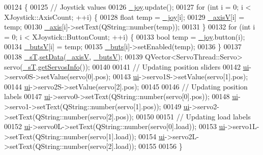 \begin{DoxyCode}
00124 \{
00125     \textcolor{comment}{// Joystick values}
00126     \hyperlink{a00005_a671f35800890e518713e1946671d8730}{\_joy}.update();
00127     \textcolor{keywordflow}{for} (\textcolor{keywordtype}{int} i = 0; i < XJoystick::AxisCount; ++i) \{
00128         \textcolor{keywordtype}{float} temp = \hyperlink{a00005_a671f35800890e518713e1946671d8730}{\_joy}[i];
00129         \hyperlink{a00005_a20f66f574ed4c96d8dfc0013e1095f15}{\_axisV}[i] = temp;
00130         \hyperlink{a00005_a30c99d7a544f74b0650758e5cc7ead5a}{\_axis}[i]->setText(QString::number(temp));
00131     \}
00132     \textcolor{keywordflow}{for} (\textcolor{keywordtype}{int} i = 0; i < XJoystick::ButtonCount; ++i) \{
00133         \textcolor{keywordtype}{bool} temp = \hyperlink{a00005_a671f35800890e518713e1946671d8730}{\_joy}.button(i);
00134         \hyperlink{a00005_a519ae4630572cb63fbd04bce12fe8e77}{\_butsV}[i] = temp;
00135         \hyperlink{a00005_a8eaf474e1b8672f32873ed009e28ce8a}{\_buts}[i]->setEnabled(temp);
00136     \}
00137     
00138     \hyperlink{a00005_a97f8ecc7ecb930b796178cef7b975013}{\_sT}.\hyperlink{a00008_a8497ea56991b620981ce1fbf53d9ebdb}{setData}(\hyperlink{a00005_a20f66f574ed4c96d8dfc0013e1095f15}{\_axisV}, \hyperlink{a00005_a519ae4630572cb63fbd04bce12fe8e77}{\_butsV});
00139     QVector<ServoThread::Servo> servo(\hyperlink{a00005_a97f8ecc7ecb930b796178cef7b975013}{\_sT}.\hyperlink{a00008_a5fd8ef13314428f5ba7646730cc58f1c}{getServosInfo}());
00140     
00141     \textcolor{comment}{// Updating position sliders}
00142     \hyperlink{a00005_a35466a70ed47252a0191168126a352a5}{ui}->servo0S->setValue(servo[0].pos);
00143     \hyperlink{a00005_a35466a70ed47252a0191168126a352a5}{ui}->servo1S->setValue(servo[1].pos);
00144     \hyperlink{a00005_a35466a70ed47252a0191168126a352a5}{ui}->servo2S->setValue(servo[2].pos);
00145     
00146     \textcolor{comment}{// Updating position labels}
00147     \hyperlink{a00005_a35466a70ed47252a0191168126a352a5}{ui}->servo0->setText(QString::number(servo[0].pos));
00148     \hyperlink{a00005_a35466a70ed47252a0191168126a352a5}{ui}->servo1->setText(QString::number(servo[1].pos));
00149     \hyperlink{a00005_a35466a70ed47252a0191168126a352a5}{ui}->servo2->setText(QString::number(servo[2].pos));
00150     
00151     \textcolor{comment}{// Updating load labels}
00152     \hyperlink{a00005_a35466a70ed47252a0191168126a352a5}{ui}->servo0L->setText(QString::number(servo[0].load));
00153     \hyperlink{a00005_a35466a70ed47252a0191168126a352a5}{ui}->servo1L->setText(QString::number(servo[1].load));
00154     \hyperlink{a00005_a35466a70ed47252a0191168126a352a5}{ui}->servo2L->setText(QString::number(servo[2].load));
00155     
00156 \}
\end{DoxyCode}
\hypertarget{a00005_a6fd62e117414acda4fe6a93c453dfb93}{}
